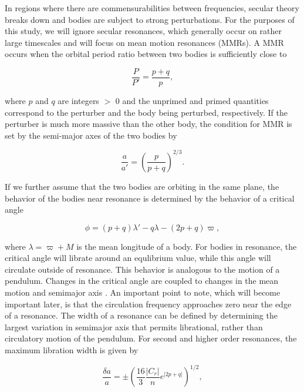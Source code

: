 \documentclass[twocolumn]{aastex63}
\begin{document}
In regions where there are commensurabilities between frequencies, secular theory breaks down and bodies are subject to strong 
perturbations. For the purposes of this study, we will ignore secular resonances, which generally occur on rather large timescales 
and will focus on mean motion resonances (MMRs). A MMR occurs  when the orbital period ratio between two bodies is sufficiently 
close to

\begin{equation}\label{eq:per_mmr}
	\frac{P}{P'} = \frac{p + q}{p},
\end{equation}

\noindent where  $p$ and $q$ are integers $>$ 0 and the unprimed and primed quantities correspond to the perturber and the body 
being perturbed, respectively. If the perturber is much more massive than the other body, the condition for MMR is set  by the semi-major 
axes of the two bodies by

\begin{equation}\label{eq:a_mmr}
	\frac{a}{a'} = \left( \frac{p}{p + q} \right)^{2/3}.
\end{equation}

If we further assume that the two bodies are orbiting in the same plane, the behavior of the bodies near resonance is determined by the
behavior of a critical angle

\begin{equation}\label{eq:phi_crit}
	\phi = (p + q) \lambda' - q \lambda - (2 p + q) \varpi,
\end{equation}

\noindent where $\lambda = \varpi + M$ is the mean longitude of a body. For bodies in resonance, the critical angle will librate around an 
equlibrium value, while this angle will circulate outside of resonance. This behavior is analogous to the motion of a pendulum. Changes in the 
critical angle are coupled to changes in the mean motion and semimajor axis \citet{2000ssd..book.....M}. An important point to note, which will 
become important later, is that the circulation frequency approaches zero near the edge of a resonance. The width of a resonance can be 
defined by determining the largest variation in semimajor axis that permits librational, rather than circulatory motion of the pendulum. For 
second and higher order resonances, the maximum libration width is given by

\begin{equation}\label{eq:res_so}
	\frac{\delta a}{a} = \pm \left( \frac{16}{3} \frac{\left| C_{r} \right|}{n} e^{\left| 2 p + q \right|} \right)^{1/2},
\end{equation}
\end{document}
